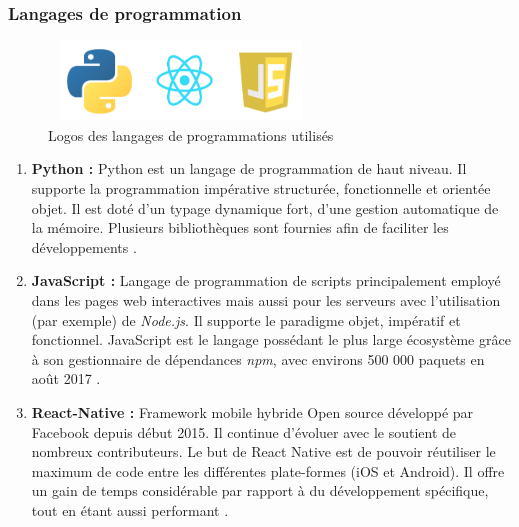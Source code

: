         \subsubsection{Langages de programmation}
            \begin{figure}[H]
                    \centering
                    \includegraphics[height=60pt,width=200pt]{img/chapter4/tools/language.png}
                    \caption{Logos des langages de programmations utilisés}
                    \label{}
            \end{figure}
            \begin{enumerate}
                \item{\textbf{Python : }}
                Python est un langage de programmation de haut niveau. Il supporte la programmation impérative structurée, fonctionnelle et orientée objet. Il est doté d'un typage dynamique fort, d'une gestion automatique de la mémoire. Plusieurs bibliothèques sont fournies afin de faciliter les développements \cite{python}.\\

                \item{\textbf{JavaScript : }}
                Langage de programmation de scripts principalement employé dans les pages web interactives mais aussi pour les serveurs avec l'utilisation (par exemple) de \emph{Node.js}. Il supporte le paradigme objet, impératif et fonctionnel. JavaScript est le langage possédant le plus large écosystème grâce à son gestionnaire de dépendances \emph{npm}, avec environs 500 000 paquets en août 2017 \cite{javascript}.\\

                \item{\textbf{React-Native : }}
                Framework mobile hybride Open source développé par Facebook depuis début 2015. Il continue d'évoluer avec le soutient de nombreux contributeurs. Le but de React Native est de pouvoir réutiliser le maximum de code entre les différentes plate-formes (iOS et Android). Il offre un gain de temps considérable par rapport à du développement spécifique, tout en étant aussi performant \cite{reactnative}.
            \end{enumerate}

